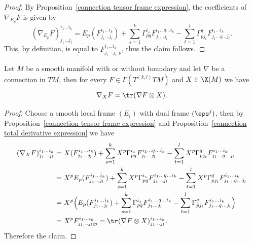 \begin{proof}
By Proposition~\ref{connection tensor frame expression}, the coefficients of $\nabla_{E_p}F$ is given by
\[(\nabla_{E_p}F)^{i_1\dots i_k}_{j_1\dots j_l}=E_p(F^{i_1\dots i_k}_{j_1\dots j_l})+\sum_{s=1}^{k}\Gamma_{pq}^{i_s}F^{i_1\dots q\dots i_k}_{j_1\dots j_l}-\sum_{t=1}^{l}\Gamma_{pj_t}^qF^{i_1\dots i_k}_{j_1\dots q\dots j_l}.\]
This, by definition, is equal to $F^{i_1\dots i_k}_{j_1\dots j_l;p}$, thus the claim follows.
\end{proof}
\begin{corollary}\label{connection trace expression}
Let $M$ be a smooth manifold with or without boundary and let $\nabla$ be a connection in $TM$, 
then for every $F\in\Gamma(T^{(k,l)}TM)$ and $X\in\X(M)$ we have
\[\nabla_XF=\tr(\nabla F\otimes X).\]
\end{corollary}
\begin{proof}
Choose a smooth local frame $(E_i)$ with dual frame $(\eps^j)$, then by Proposition~\ref{connection tensor frame expression} 
and Proposition~\ref{connection total derivative expression} we have
\begin{align*}
(\nabla_XF)^{i_1\dots i_k}_{j_1\dots j_l}&=X(F^{i_1\dots i_k}_{j_1\dots j_l})+\sum_{s=1}^{k}X^p\Gamma_{pq}^{i_s}F^{i_1\dots q\dots i_k}_{j_1\dots j_l}-\sum_{t=1}^{l}X^p\Gamma_{pj_t}^qF^{i_1\dots i_k}_{j_1\dots q\dots j_l}\\
&=X^pE_p(F^{i_1\dots i_k}_{j_1\dots j_l})+\sum_{s=1}^{k}X^p\Gamma_{pq}^{i_s}F^{i_1\dots q\dots i_k}_{j_1\dots j_l}-\sum_{t=1}^{l}X^p\Gamma_{pj_t}^qF^{i_1\dots i_k}_{j_1\dots q\dots j_l}\\
&=X^p\Big(E_p(F^{i_1\dots i_k}_{j_1\dots j_l})+\sum_{s=1}^{k}\Gamma_{pq}^{i_s}F^{i_1\dots q\dots i_k}_{j_1\dots j_l}-\sum_{t=1}^{l}\Gamma_{pj_t}^qF^{i_1\dots i_k}_{j_1\dots q\dots j_l}\Big)\\
&=X^pF^{i_1\dots i_k}_{j_1\dots j_l;p}=\tr(\nabla F\otimes X)^{i_1\dots i_k}_{j_1\dots j_l}.
\end{align*}
Therefore the claim.
\end{proof}

